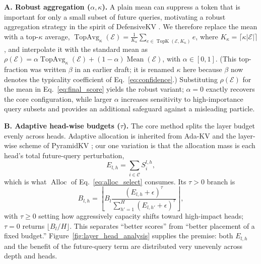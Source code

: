 \documentclass{article} %
\begin{document}
\textbf{A. Robust aggregation ($\alpha,\kappa$).}
\label{subsec:robust_aggregation}
A plain mean can suppress a token that is important for only a small subset of future queries, motivating a robust aggregation strategy in the spirit of DefensiveKV \citep{feng2025taming}. We therefore replace the mean with a top-$\kappa$ average, $\operatorname{TopAvg}_\kappa(\mathcal{E})=\frac{1}{K_\kappa}\sum_{e\in\operatorname{TopK}(\mathcal{E},K_\kappa)} e$, where $K_\kappa=\lceil \kappa|\mathcal{E}|\rceil$, and interpolate it with the standard mean as $\rho(\mathcal{E})=\alpha\operatorname{TopAvg}_\kappa(\mathcal{E})+(1-\alpha)\operatorname{Mean}(\mathcal{E})$, with $\alpha\in[0,1]$. (This top-fraction was written $\beta$ in an earlier draft; it is renamed $\kappa$ here because $\beta$ now denotes the typicality coefficient of Eq.~\eqref{eq:confidence}.) Substituting $\rho(\mathcal{E})$ for the mean in Eq.~\eqref{eq:final_score} yields the robust variant; $\alpha=0$ exactly recovers the core configuration, while larger $\alpha$ increases sensitivity to high-importance query subsets and provides an additional safeguard against a misleading particle.

\textbf{B. Adaptive head-wise budgets ($\tau$).}
\label{subsec:adaptive_budget}
The core method splits the layer budget evenly across heads. Adaptive allocation is inherited from Ada-KV \citep{feng2024adakv} and the layer-wise scheme of PyramidKV \citep{cai2024pyramidkv}; our one variation is that the allocation mass is each head's total future-query perturbation,
\begin{equation}
E_{l,h}=\sum_{i\in\mathcal{C}}S^{l,h}_{i},
\label{eq:pert_mass}
\end{equation}
which is what $\operatorname{Alloc}$ of Eq.~\eqref{eq:alloc_select} consumes. Its $\tau>0$ branch is
\begin{equation}
B_{l,h}=\left\lfloor
B_l\frac{(E_{l,h}+\epsilon)^{\tau}}{\sum_{h'=1}^{H}(E_{l,h'}+\epsilon)^{\tau}}
\right\rfloor,
\label{eq:adaptive_budget}
\end{equation}
with $\tau\ge0$ setting how aggressively capacity shifts toward high-impact heads; $\tau=0$ returns $\lfloor B_l/H\rfloor$. This separates ``better scores'' from ``better placement of a fixed budget.'' Figure~\ref{fig:layer_head_analysis} supplies the premise: both $E_{l,h}$ and the benefit of the future-query term are distributed very unevenly across depth and heads.
\end{document}
